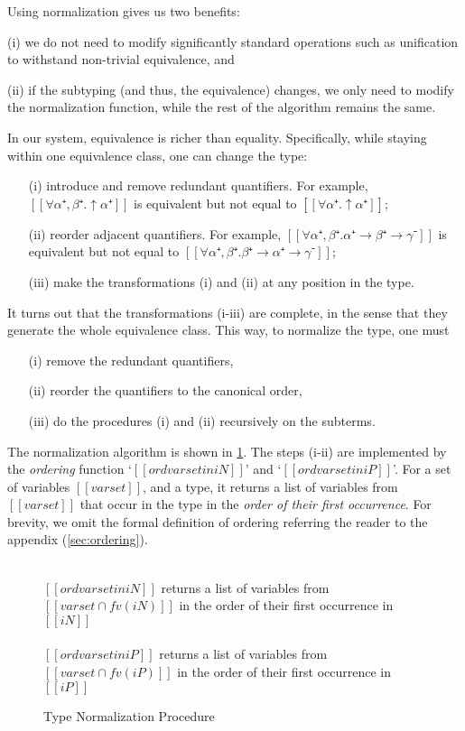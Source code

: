 Using normalization gives us two benefits:
\begin{enumerate*}
  \item [(i)] we do not need to modify significantly standard operations such as unification to withstand non-trivial equivalence, and
  \item [(ii)] if the subtyping (and thus, the equivalence) changes, we only need to modify the normalization function, 
    while the rest of the algorithm remains the same.
\end{enumerate*}

In our system, equivalence is richer than equality. Specifically,
while staying within one equivalence class, one can 
change the type:
\begin{enumerate}
  \item[(i)] introduce and remove redundant quantifiers. For example, $[[∀α⁺,β⁺.↑α⁺]]$ is equivalent
  but not equal to $[[∀α⁺.↑α⁺]]$;
  \item[(ii)] reorder adjacent quantifiers. For example, $[[∀α⁺,β⁺.α⁺ → β⁺ → γ⁻]]$ is equivalent but not equal to
  $[[∀α⁺,β⁺.β⁺ → α⁺ → γ⁻]]$; 
  \item[(iii)] make the transformations (i) and (ii) at any position in the type.
\end{enumerate}

It turns out that the transformations (i-iii) are complete, 
in the sense that they generate the whole equivalence class.
This way, to normalize the type, one must
\begin{enumerate}
  \item [(i)] remove the redundant quantifiers,
  \item [(ii)] reorder the quantifiers to the canonical order,
  \item [(iii)] do the procedures (i) and (ii) recursively on the subterms.
\end{enumerate}

The normalization algorithm is shown in \cref{fig:type-nf}.
The steps (i-ii) are implemented by the \emph{ordering} function
`$[[ord varset in iN]]$' and `$[[ord varset in iP]]$'.
For a set of variables $[[varset]]$, and a type, it 
returns a list of variables from $[[varset]]$ that occur in the type in 
the \emph{order of their first occurrence}.
For brevity, we omit the formal definition of ordering referring the reader to the appendix (\cref{sec:ordering}).

\begin{figure}[h]
  
  \begin{multicols}{2}
  \ottdefnNrmNNormLabeled{}
  \\
  $[[ord varset in iN]]$ returns a list of variables from 
  $[[varset ∩ fv(iN)]]$ in the order of their first occurrence in $[[iN]]$
  \columnbreak\\
  \ottdefnNrmPNormLabeled{}
  \\
  $[[ord varset in iP]]$ returns a list of variables from 
  $[[varset ∩ fv(iP)]]$ in the order of their first occurrence in $[[iP]]$
  \end{multicols}


  \caption{Type Normalization Procedure} 
  \label{fig:type-nf}
\end{figure}


